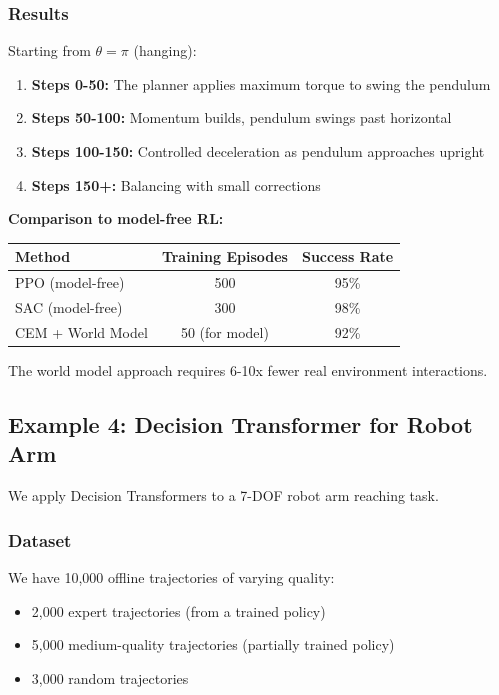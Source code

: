 \subsubsection{Results}

Starting from $\theta = \pi$ (hanging):

\begin{enumerate}
    \item \textbf{Steps 0-50:} The planner applies maximum torque to swing the pendulum
    \item \textbf{Steps 50-100:} Momentum builds, pendulum swings past horizontal
    \item \textbf{Steps 100-150:} Controlled deceleration as pendulum approaches upright
    \item \textbf{Steps 150+:} Balancing with small corrections
\end{enumerate}

\textbf{Comparison to model-free RL:}

\begin{center}
\begin{tabular}{lcc}
\toprule
\textbf{Method} & \textbf{Training Episodes} & \textbf{Success Rate} \\
\midrule
PPO (model-free) & 500 & 95\% \\
SAC (model-free) & 300 & 98\% \\
CEM + World Model & 50 (for model) & 92\% \\
\bottomrule
\end{tabular}
\end{center}

The world model approach requires 6-10x fewer real environment interactions.

\subsection{Example 4: Decision Transformer for Robot Arm}

We apply Decision Transformers to a 7-DOF robot arm reaching task.

\subsubsection{Dataset}

We have 10,000 offline trajectories of varying quality:
\begin{itemize}
    \item 2,000 expert trajectories (from a trained policy)
    \item 5,000 medium-quality trajectories (partially trained policy)
    \item 3,000 random trajectories
\end{itemize}


